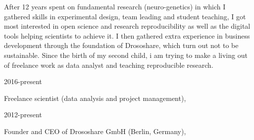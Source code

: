
After 12 years spent on fundamental research (neuro-genetics) in which I gathered skills in experimental design, team leading and student teaching, I got most interested in open science and research reproducibility as well as the digital tools helping scientists to achieve it.
I then gathered extra experience in business development through the foundation of Drososhare, which turn out not to be sustainable. Since the birth of my second child, i am trying to make a living out of freelance work as data analyst and teaching reproducible research.


%
\parbox{0.15\textwidth}{2016-present}\hfill
\parbox[t]{0.83\textwidth}{Freelance scientist (data analysis and project management),\\
        }     
%
\parbox{0.15\textwidth}{2012-present}\hfill
\parbox[t]{0.83\textwidth}{Founder and CEO 
       of Drososhare GmbH (Berlin, Germany),\\
        }


